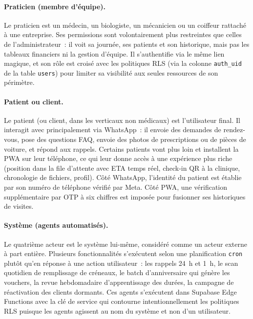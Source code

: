 \paragraph{Praticien (membre d'équipe).}
Le praticien est un médecin, un biologiste, un mécanicien ou un
coiffeur rattaché à une entreprise. Ses permissions sont
volontairement plus restreintes que celles de l'administrateur~: il
voit sa journée, ses patients et son historique, mais pas les
tableaux financiers ni la gestion d'équipe. Il s'authentifie via le
même lien magique, et son rôle est croisé avec les politiques RLS
(via la colonne \texttt{auth\_uid} de la table \texttt{users}) pour
limiter sa visibilité aux seules ressources de son périmètre.

\paragraph{Patient ou client.}
Le patient (ou client, dans les verticaux non médicaux) est
l'utilisateur final. Il interagit avec \nova{} principalement via
WhatsApp~: il envoie des demandes de rendez-vous, pose des questions
FAQ, envoie des photos de prescriptions ou de pièces de voiture, et
répond aux rappels. Certains patients vont plus loin et installent
la PWA \nova{} sur leur téléphone, ce qui leur donne accès à une
expérience plus riche (position dans la file d'attente avec ETA
temps réel, check-in QR à la clinique, chronologie de fichiers,
profil). Côté WhatsApp, l'identité du patient est établie par son
numéro de téléphone vérifié par Meta. Côté PWA, une vérification
supplémentaire par OTP à six chiffres est imposée pour fusionner
ses historiques de visites.

\paragraph{Système (agents automatisés).}
Le quatrième acteur est le système lui-même, considéré comme un
acteur externe à part entière. Plusieurs fonctionnalités
s'exécutent selon une planification \texttt{cron} plutôt qu'en
réponse à une action utilisateur~: les rappels 24~h et 1~h, le
scan quotidien de remplissage de créneaux, le batch d'anniversaire
qui génère les vouchers, la revue hebdomadaire d'apprentissage des
durées, la campagne de réactivation des clients dormants. Ces
agents s'exécutent dans Supabase Edge Functions avec la clé de
service qui contourne intentionnellement les politiques RLS puisque
les agents agissent au nom du système et non d'un utilisateur.

